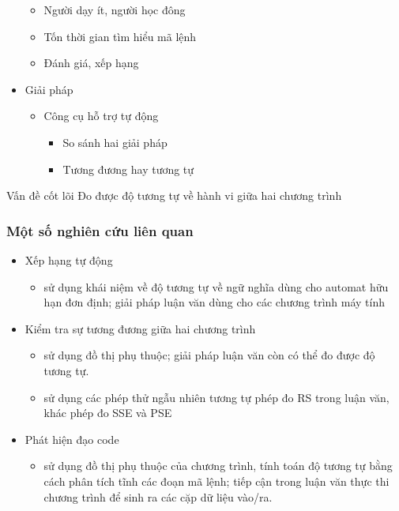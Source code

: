 \documentclass{beamer}
\begin{document}
\begin{frame}
\begin{minipage}{0.59\linewidth}
\begin{itemize}
      \begin{itemize}
      \item Người dạy ít, người học đông
      \item Tốn thời gian tìm hiểu mã lệnh 
      \item Đánh giá, xếp hạng
      \end{itemize} \pause
    \item Giải pháp
      \begin{itemize}
      \item Công cụ hỗ trợ tự động 
      	\begin{itemize}
      	\item So sánh hai giải pháp
      	\item Tương đương hay tương tự      	
    	\end{itemize}
      \end{itemize}
    \end{itemize} \pause
	\begin{block}{Vấn đề cốt lõi}
		Đo được độ tương tự về hành vi giữa hai chương trình
	\end{block}
  \end{minipage}
\end{frame}

\begin{frame}
  \frametitle{Một số nghiên cứu liên quan}  
  \begin{itemize}
  \item Xếp hạng tự động
    \begin{itemize}
    \item \cite{alur2013automated} sử dụng khái niệm về độ tương tự về ngữ nghĩa dùng cho automat hữu hạn đơn định; giải pháp luận văn dùng cho các chương trình máy tính    
    \end{itemize}
  \item Kiểm tra sự tương đương giữa hai chương trình
    \begin{itemize}
    \item \cite{bates1993incremental} sử dụng đồ thị phụ thuộc; giải pháp luận văn còn có thể đo được độ tương tự. 
    \item \cite{jiang2009automatic} sử dụng các phép thử ngẫu nhiên tương tự phép đo RS trong luận văn, khác phép đo SSE và PSE
    \end{itemize}
  \item Phát hiện đạo code
    \begin{itemize}
    \item \cite{komondoor2001using} sử dụng đồ thị phụ thuộc của chương trình, tính toán độ tương tự bằng cách phân tích tĩnh các đoạn mã lệnh; tiếp cận trong luận văn thực thi chương trình để sinh ra các cặp dữ liệu vào/ra.
    \end{itemize}
  \end{itemize}

\end{frame}
\end{document}
